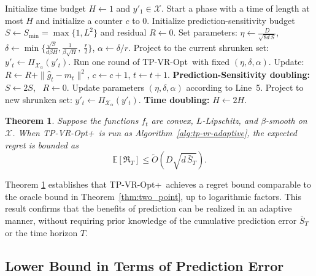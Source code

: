 \documentclass[journal,onecolumn]{IEEEtran}
\newcommand{\cX}{\mathcal{X}}
\theoremstyle{plain}
\newtheorem{theorem}{Theorem}[section]
\theoremstyle{definition}
\theoremstyle{remark}
\newcommand{\regret}{\mathfrak{R}}
\newcommand{\tpvr}{{\sc TP-VR-Opt}}
\newcommand{\tpvrplus}{{\sc TP-VR-Opt+}}
\begin{document}
\begin{algorithm}
    [t]
    \caption{\tpvrplus}
    \label{alg:tp-vr-adaptive}
    \begin{algorithmic}
        [1] \STATE Initialize time budget $H\leftarrow 1$ and $y'_1\in \cX$.
         \STATE Start a phase with a time of length at most $H$ and initialize a counter $c$ to 0. 
        \STATE Initialize prediction-sensitivity budget $S\leftarrow
        S_{\min}=\max\{1,L^2\}$ and residual $R\leftarrow 0$. 
        \STATE Set parameters: $\eta \leftarrow
        \frac{D}{\sqrt{8d\,S}}$, $\delta \leftarrow \min\Big\{\frac{\sqrt{S}}{d\beta
        H}, \frac{1}{\beta\sqrt{H}},\ \frac{r}{2}\Big\}$, $\alpha\leftarrow \delta/
        r.$ 
        \STATE Project to the current shrunken set:
        $y'_t\leftarrow \Pi_{\cX_\alpha}(y'_t)$.  \STATE Run one round
        of \tpvr\, with fixed $(\eta,\delta,\alpha)$. \STATE Update: $R\leftarrow\!
        R+\|\hat g_{t}-m_{t}\|^{2}$, $c\leftarrow c+1$, $t\leftarrow t+1$.
        \STATE \textbf{Prediction-Sensitivity doubling:} $S\leftarrow 2S$, \ $R\leftarrow
        0$. \STATE Update parameters $(\eta, \delta,\alpha)$ according to Line~5. \STATE
        Project to new shrunken set: $y'_t\leftarrow \Pi_{\cX_\alpha}(y'_t)$. \ENDIF \ENDWHILE
        \STATE \textbf{Time doubling:} $H \leftarrow 2H$. \ENDWHILE
    \end{algorithmic}
\end{algorithm}

\begin{theorem}
    \label{thm:tp-vr-adaptive} Suppose the functions $f_{t}$ are convex, $L$-Lipschitz,
    and $\beta$-smooth on $\cX$. When \tpvrplus\, is run as Algorithm~\ref{alg:tp-vr-adaptive},
    the expected regret is bounded as
    \begin{equation*}
        \mathbb{E}[\regret_{T}]\le \widetilde{O}\left( D\sqrt{d\,\bar S_{T}}\right).
    \end{equation*}
\end{theorem}

Theorem \ref{thm:tp-vr-adaptive} establishes that \tpvrplus\, achieves a regret
bound comparable to the oracle bound in Theorem~\ref{thm:two_point}, up to logarithmic
factors. This result confirms that the benefits of prediction can be
realized in an adaptive manner, without requiring prior knowledge of the cumulative
prediction error $\bar S_{T}$ or the time horizon $T$.

\subsection{Lower Bound in Terms of Prediction Error}
\label{sec:tp-vr-minimax}
\end{document}
